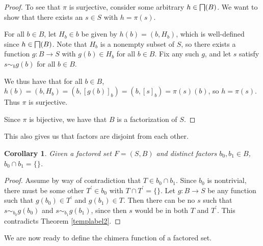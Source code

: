 \documentclass[authordate,onecolumn]{miri-tech-article}
\newtheorem{corollary}{Corollary}
\begin{document}
\begin{proof}
To see that $\pi$ is surjective, consider some arbitrary $h\in \bigsqcap(B)$. We want to show that there exists an $s\in S$ with $h=\pi(s)$.

For all $b\in B$, let $H_b\in b$ be given by $h(b)=(b,H_b)$, which is well-defined since $h\in \bigsqcap(B)$. Note that $H_b$ is a nonempty subset of $S$, so there exists a function $g:B\rightarrow S$ with $g(b)\in H_b$ for all $b\in B$. Fix any such $g$, and let $s$ satisfy $s\sim_b g(b)$ for all $b\in B$. 

We thus have that for all $b\in B$, $h(b)=(b,H_b)=(b,[g(b)]_b)=(b,[s]_b)=\pi(s)(b)$, so $h=\pi(s)$. Thus $\pi$ is surjective. 

Since $\pi$ is bijective, we have that $B$ is a factorization of $S$.
\end{proof}
This also gives us that factors are disjoint from each other.
\begin{corollary}\label{basisdisjoint}
Given a factored set $F=(S,B)$ and distinct factors $b_0,b_1\in B$, $b_0\cap b_1=\{\}$.
\end{corollary}
\begin{proof}
Assume by way of contradiction that $T\in b_0\cap b_1$. Since $b_0$ is nontrivial, there must be some other $T^\prime\in b_0$ with $T\cap T^\prime=\{\}$. Let $g:B\rightarrow S$ be any function such that $g(b_0)\in T^\prime$ and $g(b_1)\in T$. Then there can be no $s$ such that $s\sim_{b_0} g(b_0)$ and $s\sim_{b_1}g(b_1)$, since then $s$ would be in both $T$ and $T^\prime$. This contradicts Theorem \ref{templabel2}.
\end{proof}

We are now ready to define the chimera function of a factored set.
\end{document}
